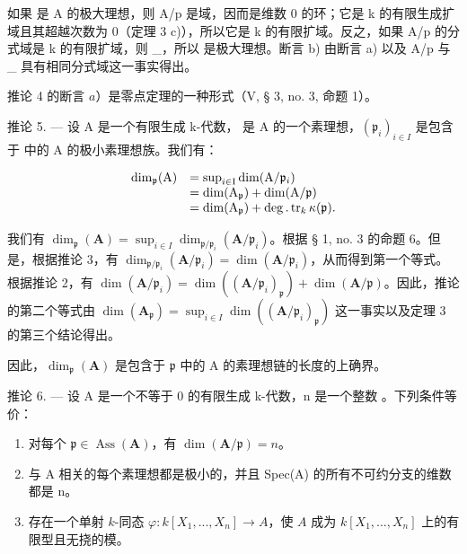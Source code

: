 如果  是 A 的极大理想，则 A/p 是域，因而是维数 0 的环；它是 k 的有限生成扩域且其超越次数为 0（定理 3 c)），所以它是 k 的有限扩域。反之，如果 A/p 的分式域是 k 的有限扩域，则 \_，所以  是极大理想。断言 b) 由断言 a) 以及 A/p 与 \_ 具有相同分式域这一事实得出。

推论 4 的断言 \(a\)）是零点定理的一种形式（V, § 3, no. 3, 命题 1）。

推论 5. --- 设 A 是一个有限生成 k-代数，  是 A 的一个素理想，\((\mathfrak{p}_{i})_{i\in I}\) 是包含于  中的 A 的极小素理想族。我们有：

\[
\begin{array}{r l} \dim_ {\mathfrak {p}} (\mathrm{A}) & = \sup _ {i \in \mathrm{I}} \dim (\mathrm{A} / \mathfrak {p} _ {i}) \\ & = \dim (\mathrm{A} _ {\mathfrak {p}}) + \dim (\mathrm{A} / \mathfrak {p}) \\ & = \dim (\mathrm{A} _ {\mathfrak {p}}) + \deg . \operatorname{tr} _ {k} \kappa (\mathfrak {p}). \end{array}
\]

我们有 \(\dim_{\mathfrak{p}}(\mathbf{A}) = \sup_{i\in I}\dim_{\mathfrak{p} / \mathfrak{p}_i}(\mathbf{A} / \mathfrak{p}_i)\)。根据 § 1, no. 3 的命题 6。但是，根据推论 3，有 \(\dim_{\mathfrak{p} / \mathfrak{p}_i}(\mathbf{A} / \mathfrak{p}_i) = \dim (\mathbf{A} / \mathfrak{p}_i)\)，从而得到第一个等式。根据推论 2，有 \(\dim (\mathbf{A} / \mathfrak{p}_i) = \dim ((\mathbf{A} / \mathfrak{p}_i)_{\mathfrak{p}}) + \dim (\mathbf{A} / \mathfrak{p})\)。因此，推论的第二个等式由 \(\dim (\mathbf{A}_{\mathfrak{p}}) = \sup_{i\in I}\dim ((\mathbf{A} / \mathfrak{p}_i)_{\mathfrak{p}})\) 这一事实以及定理 3 的第三个结论得出。

因此，\(\dim_{\mathfrak{p}}(\mathbf{A})\) 是包含于 \(\mathfrak{p}\) 中的 A 的素理想链的长度的上确界。

推论 6. --- 设 A 是一个不等于 0 的有限生成 k-代数，n 是一个整数 。下列条件等价：

\begin{enumerate}
\def\labelenumi{\alph{enumi})}
\item
  对每个 \(\mathfrak{p} \in \operatorname{Ass}(\mathbf{A})\)，有 \(\dim(\mathbf{A}/\mathfrak{p}) = n\)。
\item
  与 A 相关的每个素理想都是极小的，并且 Spec(A) 的所有不可约分支的维数都是 n。
\item
存在一个单射 \(k\)-同态 \(\varphi: k[X_1, ..., X_n] \to A\)，使 \(A\) 成为 \(k[X_1, ..., X_n]\) 上的有限型且无挠的模。
\end{enumerate}

